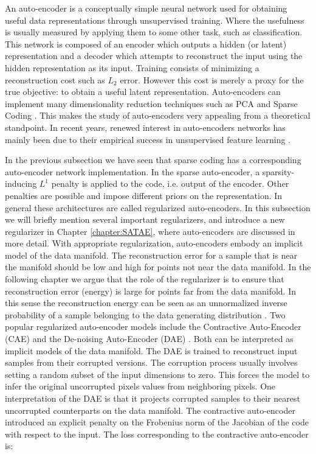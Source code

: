 An auto-encoder is a conceptually simple neural network used for obtaining
useful data representations through unsupervised training. Where the usefulness
is usually measured by applying them to some other task, such as
classification.  This network is composed of an encoder which outputs a hidden
(or latent) representation and a decoder which attempts to reconstruct the
input using the hidden representation as its input.  Training consists of
minimizing a reconstruction cost such as $L_2$ error.  However this cost is
merely a proxy for the true objective: to obtain a useful latent
representation. Auto-encoders can implement many dimensionality reduction
techniques such as PCA and Sparse Coding \cite{DHS,SC,LISTA}.
This makes the study of auto-encoders very appealing from a theoretical
standpoint. In recent years, renewed interest in auto-encoders networks has
mainly been due to their empirical success in unsupervised feature learning
\cite{SAE1,SAE2,CAE,DAE}. 

In the previous subsection we have seen that sparse coding has a corresponding
auto-encoder network implementation. In the sparse auto-encoder, a
sparsity-inducing $L^1$ penalty is applied to the code, i.e. output of the
encoder. Other penalties are possible and impose different priors on the
representation. In general these architectures are called regularized
auto-encoders. In this subsection we will briefly mention several important
regularizers, and introduce a new regularizer in Chapter \ref{chapter:SATAE},
where auto-encoders are discussed in more detail. With appropriate regularization,
auto-encoders embody an implicit model of the data manifold. The reconstruction
error for a sample that is near the manifold should be low and high for points not
near the data manifold.  In the following chapter we argue that the role of the
regularizer is to ensure that reconstruction error (energy) is large for points
far from the data manifold. In this sense the reconstruction energy can be seen
as an unnormalized inverse probability of a sample belonging to the data generating
distribution \cite{lecun2006}. Two popular regularized auto-encoder models
include the Contractive Auto-Encoder (CAE) and the De-noising Auto-Encoder
(DAE) \cite{CAE,DAE}. Both can be interpreted as implicit models of the data
manifold. The DAE is trained to reconstruct input samples from their 
corrupted versions. The corruption process usually involves setting a random subset 
of the input dimensions to zero. This forces the model to infer the original uncorrupted pixels 
values from neighboring pixels. One interpretation of the DAE is that it projects 
corrupted samples to their nearest uncorrupted counterparts on the data manifold. The
contractive auto-encoder introduced an explicit penalty on the Frobenius 
norm of the Jacobian of the code with respect to the input. The loss corresponding 
to the contractive auto-encoder is: 

